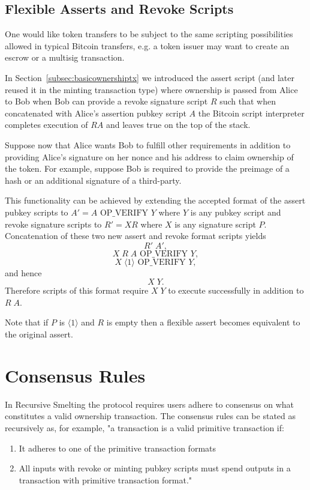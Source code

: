 \documentclass[9pt,oneside]{amsart}
\begin{document}
\subsection{Flexible Asserts and Revoke Scripts}\label{subsec:flexassertrevoke}
One would like token transfers to be subject to the same scripting possibilities allowed in typical Bitcoin transfers, e.g. a token issuer may want to create an escrow or a multisig transaction.

In Section~\ref{subsec:basicownershiptx} we introduced the assert script (and later reused it in the minting transaction type) where ownership is passed from Alice to Bob when Bob can provide a revoke signature script $R$ such that when concatenated with Alice's assertion pubkey script $A$ the Bitcoin script interpreter completes execution of $RA$ and leaves true on the top of the stack. 

Suppose now that Alice wants Bob to fulfill other requirements in addition to providing Alice's signature on her nonce and his address to claim ownership of the token. For example, suppose Bob is required to provide the preimage of a hash or an additional signature of a third-party. 

This functionality can be achieved by extending the accepted format of the assert pubkey scripts to $A' = A \text{ OP\_VERIFY } Y$ where $Y$ is any pubkey script and revoke signature scripts to $R' = X R$ where $X$ is any signature script $P$. Concatenation of these two new assert and revoke format scripts yields
\[R' \; A',\]
\[X \; R \; A \text{ OP\_VERIFY } Y,\]
\[X \; \langle 1 \rangle \text{ OP\_VERIFY } Y,\]
and hence
\[X \; Y.\]
Therefore scripts of this format require $X \; Y$ to execute successfully in addition to $R \; A$. 

Note that if $P$ is $\langle 1 \rangle$ and $R$ is empty then a flexible assert becomes equivalent to the original assert.


\section{Consensus Rules}
In Recursive Smelting the protocol requires users adhere to consensus on what constitutes a valid ownership transaction. The consensus rules can be stated as recursively as, for example, "a  transaction is a valid primitive transaction if:
    \begin{enumerate}
        \item It adheres to one of the primitive transaction formats 
        \item All inputs with revoke or minting pubkey scripts must  spend outputs in a transaction with primitive transaction format."
    \end{enumerate}
    
\end{document}
